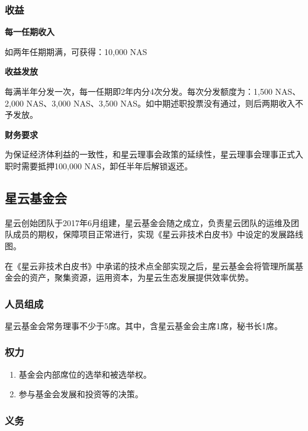 \subsubsection{收益}

\textbf{每一任期收入}

如两年任期期满，可获得：10,000 NAS

\vspace{2em}

\textbf{收益发放}

每满半年分发一次，每一任期即2年内分4次分发。每次分发额度为：1,500 NAS、2,000 NAS、3,000 NAS、3,500 NAS。如中期述职投票没有通过，则后两期收入不予发放。

\vspace{2em}

\textbf{财务要求}

为保证经济体利益的一致性，和星云理事会政策的延续性，星云理事会理事正式入职时需要抵押100,000 NAS，卸任半年后解锁返还。

\vspace{2em}

\subsection{星云基金会}

星云创始团队于2017年6月组建，星云基金会随之成立，负责星云团队的运维及团队成员的期权，保障项目正常进行，实现《星云非技术白皮书》中设定的发展路线图。

在《星云非技术白皮书》中承诺的技术点全部实现之后，星云基金会将管理所属基金会的资产，聚集资源，运用资本，为星云生态发展提供效率优势。

\subsubsection{人员组成}

星云基金会常务理事不少于5席。其中，含星云基金会主席1席，秘书长1席。

\subsubsection{权力}

\begin{enumerate}
	\item 基金会内部席位的选举和被选举权。
	\item 参与基金会发展和投资等的决策。
\end{enumerate}

\subsubsection{义务}

